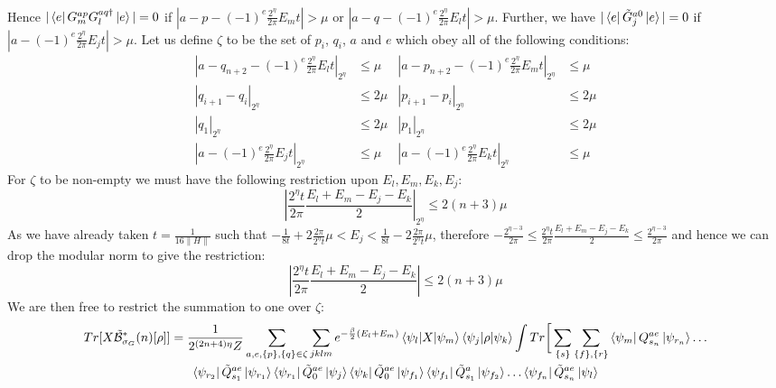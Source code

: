 \documentclass[aps,floatfix,10pt,amssymb,amsfont,amsmath,superscriptaddress,float,nofootinbib,longbibliography,nobalancelastpage,twocolumn]{revtex4-2}
\begin{document}
\begin{widetext}
\begin{multline}
\end{multline}
Hence $|\bra{e}G^{ap}_mG^{aq\dagger}_l\ket{e}| = 0$ if $|a-p-(-1)^e\frac{2^{\eta}}{2\pi}E_{m}t| > \mu$ or $|a-q-(-1)^e\frac{2^{\eta}}{2\pi}E_{l}t| > \mu$. Further, we have $|\bra{e}\tilde G^{a0}_j \ket{e}| = 0$ if $|a-(-1)^e\frac{2^{\eta}}{2\pi}E_{j}t| > \mu$. Let us define $\zeta$ to be the set of $p_i$, $q_i$, $a$ and $e$ which obey all of the following conditions:
\begin{equation}
\begin{aligned}
    |a-q_{n+2}-(-1)^e\frac{2^{\eta}}{2\pi}E_lt|_{2^{\eta}} &\leq \mu  &|a-p_{n+2}-(-1)^e\frac{2^{\eta}}{2\pi}E_mt|_{2^{\eta}} &\leq \mu\\
    |q_{i+1}-q_i|_{2^{\eta}} &\leq 2\mu  &|p_{i+1}-p_i|_{2^{\eta}} &\leq 2\mu\\
    |q_1|_{2^{\eta}} &\leq 2\mu  &|p_1|_{2^{\eta}}&\leq 2\mu\\
    |a-(-1)^{e}\frac{2^{\eta}}{2\pi}E_jt|_{2^{\eta}} &\leq \mu   &|a-(-1)^{e}\frac{2^{\eta}}{2\pi}E_kt|_{2^{\eta}}& \leq \mu
\end{aligned}
\end{equation}
For $\zeta$ to be non-empty we must have the following restriction upon $E_l,E_m,E_k, E_j$:
\begin{equation}
    \left|\frac{2^{\eta}t}{2\pi}\frac{E_l+E_m-E_j-E_k}{2}\right|_{2^{\eta}} \leq 2(n+3)\mu
\end{equation}
As we have already taken $t= \frac{1}{16\|H\|}$ such that $-\frac{1}{8t} + 2\frac{2\pi}{2^{\eta}t}\mu < E_j < \frac{1}{8t} - 2\frac{2\pi}{2^{\eta}t}\mu$, therefore $-\frac{2^{\eta-3}}{2\pi}\leq \frac{2^{\eta}t}{2\pi}\frac{E_l+E_m-E_j-E_k}{2} \leq \frac{2^{\eta-3}}{2\pi}$ and hence we can drop the modular norm to give the restriction:
\begin{equation}
\label{eq:energiessame}
    \left|\frac{2^{\eta}t}{2\pi}\frac{E_l+E_m-E_j-E_k}{2}\right| \leq 2(n+3)\mu
\end{equation}
We are then free to restrict the summation to one over $\zeta$:
\begin{multline}
    Tr[X\tilde{\mathcal{B}}^*_{\sigma_G}(n)[\rho]] = \frac{1}{2^{(2n+4)\eta}Z}\sum_{a,e, \{p\}, \{q\}\in \zeta}
    \sum_{jklm}e^{-\frac{\beta}{2}(E_l+E_m)}\braket{\psi_l|X|\psi_m}\braket{\psi_j|\rho|\psi_k}\int Tr\bigg[ \sum_{\{s\}}\sum_{\{f\}, \{r\}}\bra{\psi_m}Q^{ae}_{s_n}\ket{\psi_{r_{n}}}\ldots \\\bra{\psi_{r_2}}\tilde Q^{ae}_{s_1}\ket{\psi_{r_1}}\bra{\psi_{r_1}}\tilde Q^{ae}_0\ket{\psi_j}
\bra{\psi_k}\tilde Q^{ae}_0\ket{\psi_{f_1}}\bra{\psi_{f_1}}\tilde Q^a_{s_1}\ket{\psi_{f_2}}\ldots \bra{\psi_{f_{n}}}\tilde Q^{ae}_{s_n}\ket{\psi_l}\\

\end{multline}
\end{widetext}
\end{document}
